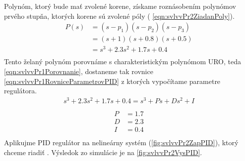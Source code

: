 \documentclass[../main.tex]{subfiles}
\begin{document}
	Polynóm, ktorý bude mať zvolené korene, získame roznásobením polynómov prvého stupňa, ktorých korene sú zvolené póly ( \cref{eqn:svlvvPr2ZiadanPoly}). 
	\begin{equation}
		\begin{aligned}
		P(s) &= (s - p_1)(s - p_2)(s - p_3) \\
		&= (s + 1)(s + 0.8)(s + 0.5) \\
		&= s^3 + 2.3s^2 + 1.7s + 0.4\\
	\end{aligned}
	\label{eqn:svlvvPr2ZiadanPoly}
	\end{equation}
	Tento želaný polynóm porovnáme s charakteristickým polynómom URO, teda \cref{eqn:svlvvPr1Porovnanie}, dostaneme tak rovnice \cref{eqn:svlvvPr1RovniceParametrovPID} z ktorých vypočítame parametre regulátora.
	\begin{equation}
		\begin{aligned}
			s^3 + 2.3s^2 + 1.7s + 0.4= s^3 + Ps + Ds^2 + I\\
		\end{aligned}
		\label{eqn:svlvvPr1Porovnanie}
	\end{equation}
	\begin{equation}
		\begin{aligned}
		\begin{matrix}
			P &= 1.7 \\
			D &= 2.3 \\ 
			I &= 0.4 \\
		\end{matrix}
		\label{eqn:svlvvPr1RovniceParametrovPID}
		\end{aligned}
	\end{equation}
	Aplikujme PID regulátor na nelineárny systém (\cref{fig:svlvvPr2ZapPID}), ktorý chceme riadiť . Výsledok zo simulácie je na \cref{fig:svlvvPr2VysPID}.	
	
\end{document}
